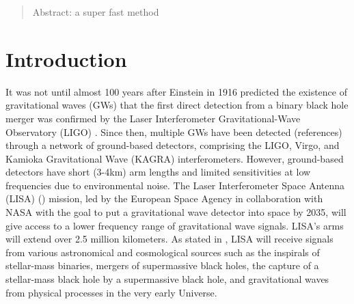 \documentclass[%
 reprint,
 amsmath,amssymb,
 aps,
]{revtex4-2}
\begin{document}
\date{\today}%

\begin{abstract}
Abstract: a super fast method
\end{abstract}

\maketitle


\section{\label{sec:introduction} Introduction}





It was not until almost 100 years after Einstein in 1916 predicted the existence of gravitational waves (GWs) that the first direct detection from a binary
black hole merger was confirmed by the Laser Interferometer Gravitational-Wave Observatory (LIGO) \cite{abbott2016observation}. Since then, multiple GWs have been detected (references) through a network of ground-based detectors, comprising the LIGO, Virgo, and Kamioka Gravitational Wave (KAGRA) interferometers. However, ground-based detectors have short (3-4km) arm lengths and limited sensitivities at low frequencies due to environmental noise. The Laser Interferometer Space Antenna (LISA) (\cite{danzmann2000lisa}) mission, led by the European Space Agency in collaboration with NASA with the goal to put a gravitational wave detector into space by 2035, will give access to a lower frequency range of gravitational wave signals. LISA's arms will extend over 2.5 million kilometers. As stated in \cite{boileau2023prospects}, LISA will receive signals from various astronomical and cosmological sources such as the inspirals of stellar-mass binaries, mergers of supermassive black holes, the capture of a stellar-mass black hole by a supermassive black hole, and gravitational waves from physical processes in the very early Universe. 
\end{document}
